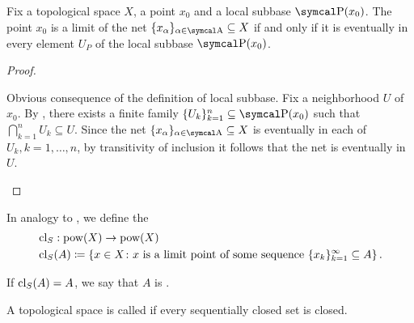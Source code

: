 \begin{proposition}\label{thm:net_convergence_via_subbases}
  Fix a topological space \( X \), a point \( x_0 \) and a local subbase \( \CP(x_0) \). The point \( x_0 \) is a limit of the net \( \{ x_\al \}_{\al \in \CA} \subseteq X \) if and only if it is eventually in every element \( U_P \) of the local subbase \( \CP(x_0) \).
\end{proposition}
\begin{proof}\mbox{}
  \begin{description}
    \Implies Obvious consequence of the definition of local subbase.
    \ImpliedBy Fix a neighborhood \( U \) of \( x_0 \). By , there exists a finite family \( \{ U_k \}_{k=1}^n \subseteq \CP(x_0) \) such that \( \bigcap_{k=1}^n U_k \subseteq U \). Since the net \( \{ x_\al \}_{\al \in \CA} \subseteq X \) is eventually in each of \( U_k, k = 1, \ldots, n \), by transitivity of inclusion it follows that the net is eventually in \( U \).
  \end{description}
\end{proof}

\begin{definition}\label{def:sequential_closure_operator}
  In analogy to , we define the 
  \begin{align*}
    &\operatorname{cl}_S: \operatorname{pow}(X) \to \operatorname{pow}(X) \\
    &\operatorname{cl}_S(A) \coloneqq \left\{ x \in X \colon x \text{ is a limit point of some sequence } \{ x_k \}_{k=1}^\infty \subseteq A \right\}.
  \end{align*}

  If \( \operatorname{cl}_S(A) = A \), we say that \( A \) is .
\end{definition}

\begin{definition}\label{def:sequential_space}
  A topological space is called  if every sequentially closed set is closed.
\end{definition}

